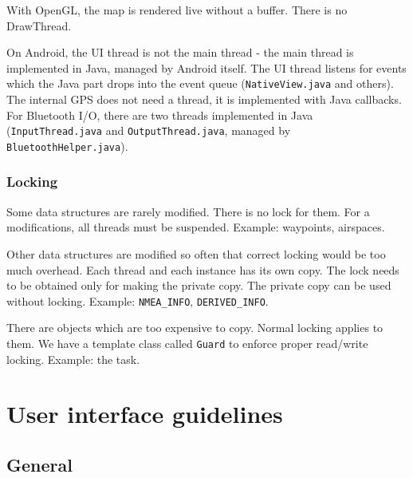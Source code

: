 \documentclass[a4paper,12pt]{refrep}
\begin{document}
With OpenGL, the map is rendered live without a buffer.  There is no
DrawThread.

On Android, the UI thread is not the main thread - the main thread is
implemented in Java, managed by Android itself.  The UI thread listens
for events which the Java part drops into the event queue
(\texttt{NativeView.java} and others).  The internal GPS does not need
a thread, it is implemented with Java callbacks.  For Bluetooth I/O,
there are two threads implemented in Java (\texttt{InputThread.java}
and \texttt{OutputThread.java}, managed by
\texttt{BluetoothHelper.java}).

\subsection{Locking}

Some data structures are rarely modified.  There is no lock for them.
For a modifications, all threads must be suspended.  Example:
waypoints, airspaces.

Other data structures are modified so often that correct locking would
be too much overhead.  Each thread and each instance has its own
copy.  The lock needs to be obtained only for making the private
copy.  The private copy can be used without locking.  Example:
\texttt{NMEA\_INFO}, \texttt{DERIVED\_INFO}.

There are objects which are too expensive to copy.  Normal locking
applies to them.  We have a template class called \texttt{Guard} to
enforce proper read/write locking.  Example: the task.

\chapter{User interface guidelines}

\section{General}
\end{document}
